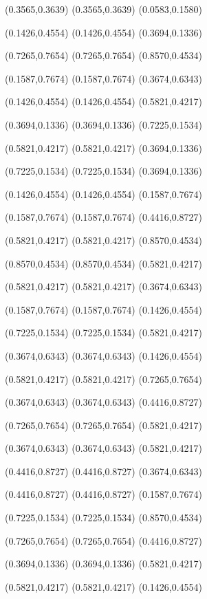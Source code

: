 \PST@Border(0.3565,0.3639)
(0.3565,0.3639)
(0.0583,0.1580)

\PST@Dashed(0.1426,0.4554)
(0.1426,0.4554)
(0.3694,0.1336)

\PST@Dashed(0.7265,0.7654)
(0.7265,0.7654)
(0.8570,0.4534)

\PST@Dashed(0.1587,0.7674)
(0.1587,0.7674)
(0.3674,0.6343)

\PST@Dashed(0.1426,0.4554)
(0.1426,0.4554)
(0.5821,0.4217)

\PST@Dashed(0.3694,0.1336)
(0.3694,0.1336)
(0.7225,0.1534)

\PST@Dashed(0.5821,0.4217)
(0.5821,0.4217)
(0.3694,0.1336)

\PST@Dashed(0.7225,0.1534)
(0.7225,0.1534)
(0.3694,0.1336)

\PST@Dashed(0.1426,0.4554)
(0.1426,0.4554)
(0.1587,0.7674)

\PST@Dashed(0.1587,0.7674)
(0.1587,0.7674)
(0.4416,0.8727)

\PST@Dashed(0.5821,0.4217)
(0.5821,0.4217)
(0.8570,0.4534)

\PST@Dashed(0.8570,0.4534)
(0.8570,0.4534)
(0.5821,0.4217)

\PST@Dashed(0.5821,0.4217)
(0.5821,0.4217)
(0.3674,0.6343)

\PST@Dashed(0.1587,0.7674)
(0.1587,0.7674)
(0.1426,0.4554)

\PST@Dashed(0.7225,0.1534)
(0.7225,0.1534)
(0.5821,0.4217)

\PST@Dashed(0.3674,0.6343)
(0.3674,0.6343)
(0.1426,0.4554)

\PST@Dashed(0.5821,0.4217)
(0.5821,0.4217)
(0.7265,0.7654)

\PST@Dashed(0.3674,0.6343)
(0.3674,0.6343)
(0.4416,0.8727)

\PST@Dashed(0.7265,0.7654)
(0.7265,0.7654)
(0.5821,0.4217)

\PST@Dashed(0.3674,0.6343)
(0.3674,0.6343)
(0.5821,0.4217)

\PST@Dashed(0.4416,0.8727)
(0.4416,0.8727)
(0.3674,0.6343)

\PST@Dashed(0.4416,0.8727)
(0.4416,0.8727)
(0.1587,0.7674)

\PST@Dashed(0.7225,0.1534)
(0.7225,0.1534)
(0.8570,0.4534)

\PST@Dashed(0.7265,0.7654)
(0.7265,0.7654)
(0.4416,0.8727)

\PST@Dashed(0.3694,0.1336)
(0.3694,0.1336)
(0.5821,0.4217)

\PST@Dashed(0.5821,0.4217)
(0.5821,0.4217)
(0.1426,0.4554)

